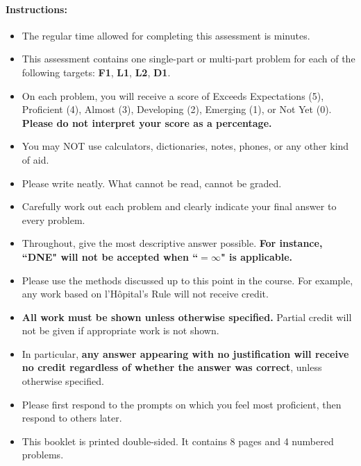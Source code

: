 \documentclass[11pt]{article}
\begin{document}
{%

\paragraph*{Instructions:}

\begin{itemize}
    
    \item The regular time allowed for completing this assessment is  minutes.
    \item This assessment contains one single-part or multi-part problem for each of the following targets: {\bf\color{ProcessBlue}F1}, {\bf\color{RoyalBlue}L1}, {\bf\color{RoyalBlue}L2}, {\bf\color{ForestGreen}D1}.
    \item On each problem, you will receive a score of Exceeds Expectations (5), Proficient (4), Almost (3), Developing (2), Emerging (1), or Not Yet (0). {\bf Please do not interpret your score as a percentage.}
    \item You may NOT use calculators, dictionaries, notes, phones, or any other kind of aid.
    \item Please write neatly. What cannot be read, cannot be graded.
    \item Carefully work out each problem and clearly indicate your final answer to every problem.
    \item Throughout, give the most descriptive answer possible. \textbf{For instance, ``DNE" will not be accepted when ``$=\infty$" is applicable.}
    \item Please use the methods discussed up to this point in the course. For example, any work based on l'H\^opital's Rule will not receive credit.
    \item \textbf{All work must be shown unless otherwise specified.} Partial credit will not be given if appropriate work is not shown.
    \item In particular, {\bf any answer appearing with no justification will receive no credit regardless of whether the answer was correct}, unless otherwise specified.
    \item Please first respond to the prompts on which you feel most proficient, then respond to others later.
    \item This booklet is printed double-sided. It contains 8 pages and 4 numbered problems.
    \end{itemize}
    
    }
\end{document}

